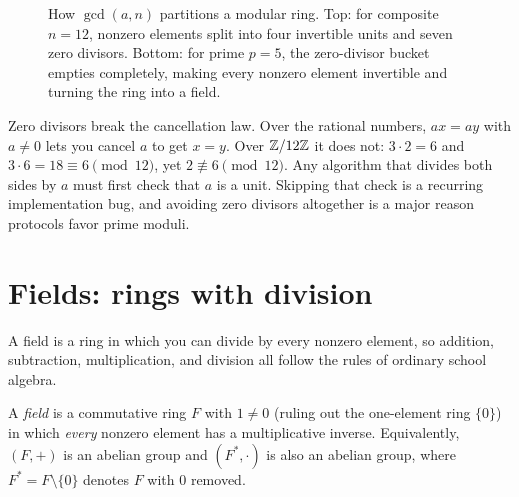 \begin{figure}[htbp]
\caption{How $\gcd(a,n)$ partitions a modular ring. Top: for composite $n=12$, nonzero elements split into four invertible units and seven zero divisors. Bottom: for prime $p=5$, the zero-divisor bucket empties completely, making every nonzero element invertible and turning the ring into a field.}
\label{fig:ch05-ring-anatomy}
\end{figure}

\begin{trapbox}
Zero divisors break the cancellation law. Over the rational numbers, $a x = a y$ with
$a \ne 0$ lets you cancel $a$ to get $x=y$. Over $\mathbb{Z}/12\mathbb{Z}$ it does not: $3\cdot 2 = 6$ and $3\cdot 6 = 18 \equiv 6 \pmod{12}$,
yet $2 \not\equiv 6 \pmod{12}$. Any algorithm that divides both sides by $a$ must first check that
$a$ is a unit. Skipping that check is a recurring implementation bug, and avoiding zero divisors altogether is a major reason protocols favor prime moduli.
\end{trapbox}

\section{Fields: rings with division}
\label{ch05:fields}

A field is a ring in which you can divide by every nonzero element, so addition, subtraction, multiplication, and division all follow the rules of ordinary school algebra.

\begin{definition}[Field]
\label{ch05:def-field}
A \emph{field} is a commutative ring $F$ with $1 \ne 0$ (ruling out the one-element ring $\{0\}$) in which \emph{every} nonzero element
has a multiplicative inverse. Equivalently, $(F,+)$ is an abelian group and
$(F^{*},\cdot)$ is also an abelian group, where $F^{*} = F\setminus\{0\}$ denotes $F$ with $0$ removed.
\end{definition}

